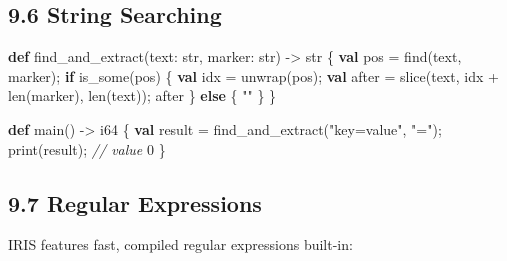 \documentclass[
  english,
]{book}
\newenvironment{Shaded}{\begin{snugshade}}{\end{snugshade}}
\newcommand{\CommentTok}[1]{\textcolor[rgb]{0.42,0.60,0.33}{\textit{#1}}}
\newcommand{\ControlFlowTok}[1]{\textcolor[rgb]{0.77,0.53,0.75}{\textbf{#1}}}
\newcommand{\DataTypeTok}[1]{\textcolor[rgb]{0.31,0.79,0.69}{#1}}
\newcommand{\DecValTok}[1]{\textcolor[rgb]{0.71,0.81,0.66}{#1}}
\newcommand{\FunctionTok}[1]{\textcolor[rgb]{0.86,0.86,0.67}{#1}}
\newcommand{\KeywordTok}[1]{\textcolor[rgb]{0.34,0.61,0.84}{\textbf{#1}}}
\newcommand{\NormalTok}[1]{\textcolor[rgb]{0.83,0.83,0.83}{#1}}
\newcommand{\OperatorTok}[1]{\textcolor[rgb]{0.83,0.83,0.83}{#1}}
\newcommand{\StringTok}[1]{\textcolor[rgb]{0.81,0.57,0.47}{#1}}
\begin{document}
\subsection{9.6 String Searching}\label{string-searching}

\begin{Shaded}
\begin{Highlighting}[]
\KeywordTok{def}\NormalTok{ find\_and\_extract(text: }\DataTypeTok{str}\NormalTok{, marker: }\DataTypeTok{str}\NormalTok{) }\OperatorTok{{-}\textgreater{}} \DataTypeTok{str}\NormalTok{ \{}
    \KeywordTok{val}\NormalTok{ pos }\OperatorTok{=} \FunctionTok{find}\NormalTok{(text, marker);}
    \ControlFlowTok{if} \FunctionTok{is\_some}\NormalTok{(pos) \{}
        \KeywordTok{val}\NormalTok{ idx }\OperatorTok{=}\NormalTok{ unwrap(pos);}
        \KeywordTok{val}\NormalTok{ after }\OperatorTok{=} \FunctionTok{slice}\NormalTok{(text, idx }\OperatorTok{+} \FunctionTok{len}\NormalTok{(marker), }\FunctionTok{len}\NormalTok{(text));}
\NormalTok{        after}
\NormalTok{    \} }\ControlFlowTok{else}\NormalTok{ \{}
        \StringTok{""}
\NormalTok{    \}}
\NormalTok{\}}

\KeywordTok{def}\NormalTok{ main() }\OperatorTok{{-}\textgreater{}} \DataTypeTok{i64}\NormalTok{ \{}
    \KeywordTok{val} \DataTypeTok{result} \OperatorTok{=}\NormalTok{ find\_and\_extract(}\StringTok{"key=value"}\NormalTok{, }\StringTok{"="}\NormalTok{);}
    \FunctionTok{print}\NormalTok{(}\DataTypeTok{result}\NormalTok{);   }\CommentTok{// value}
    \DecValTok{0}
\NormalTok{\}}
\end{Highlighting}
\end{Shaded}

\subsection{9.7 Regular Expressions}\label{regular-expressions-1}

IRIS features fast, compiled regular expressions built-in:
\end{document}
